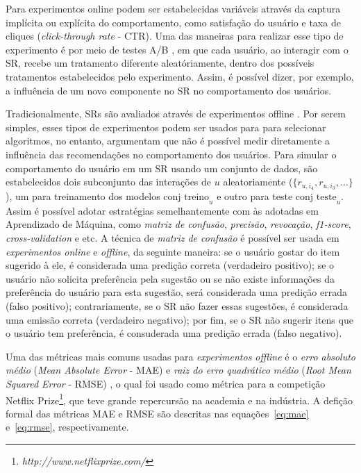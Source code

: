 \documentclass[normaltoc, espacoumemeio, pnumromarab,ruledheader]{abnt}
\begin{document}
Para experimentos online podem ser estabelecidas variáveis através da captura implícita ou explícita do comportamento, como satisfação do usuário e taxa de cliques (\textit{click-through rate} - CTR).
Uma das maneiras para realizar esse tipo de experimento é por meio de testes A/B \cite{Jannach2011}, em que cada usuário, ao interagir com o SR, recebe um tratamento diferente aleatóriamente, dentro dos possíveis tratamentos estabelecidos pelo experimento.
Assim, é possível dizer, por exemplo, a influência de um novo componente no SR no comportamento dos usuários.

Tradicionalmente, SRs são avaliados através de experimentos offline \cite{Jannach2011}.
Por serem simples, esses tipos de experimentos podem ser usados para para selecionar algoritmos, no entanto,  argumentam que não é possível medir diretamente a influência das recomendações no comportamento dos usuários.
Para simular o comportamento do usuário em um SR usando um conjunto de dados, são estabelecidos dois subconjunto das interações de $u$ aleatoriamente ($\{ r_{u,i_4}, r_{u,i_3}, \dots \}$), um para treinamento dos modelos $\text{conj treino}_u$ e outro para teste $\text{conj teste}_u$.
Assim é possível adotar estratégias semelhantemente com às adotadas em Aprendizado de Máquina, como \textit{matriz de confusão}, \textit{precisão}, \textit{revocação}, \textit{f1-score}, \textit{cross-validation} e etc.
A técnica de \textit{matriz de confusão} é possível ser usada em \textit{experimentos online} e \textit{offline}, da seguinte maneira: se o usuário gostar do item sugerido à ele, é considerada uma predição correta (verdadeiro positivo); se o usuário não solicita preferência pela sugestão ou se não existe informações da preferência do usuário para esta sugestão, será considerada uma predição errada (falso positivo); contrariamente, se o SR não fazer essas sugestões, é considerada uma emissão correta (verdadeiro negativo); por fim, se o SR não sugerir itens que o usuário tem preferência, é consuderada uma predição errada (falso negativo).

Uma das métricas mais comuns usadas para \textit{experimentos offline} é o \textit{erro absoluto médio} (\textit{Mean Absolute Error} - MAE) e \textit{raiz do erro quadrático médio} (\textit{Root Mean Squared Error} - RMSE) \cite{Jannach2011}, o qual foi usado como métrica para a competição Netflix Prize\footnote{\textit{http://www.netflixprize.com/}}, que teve grande repercursão na academia e na indústria. A defição formal das métricas MAE e RMSE são descritas nas equações~\ref{eq:mae} e~\ref{eq:rmse}, respectivamente.
\end{document}
